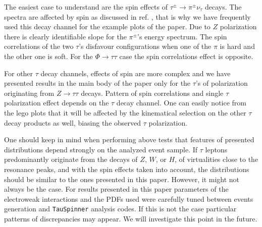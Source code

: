 \documentclass{article}
\begin{document}

The easiest case to understand are the spin effects  of $\tau^\pm \to \pi^\pm \nu_\tau$ decays. The spectra
are affected by spin as discussed in ref. \cite{jadach-was:1984,Pierzchala:2001gc}, that is why we have frequently used this decay channel for the
example plots  of the paper.
Due to $Z$ polarization  there is clearly identifiable slope for the  $\pi^\pm$'s energy spectrum.
The spin correlations of the two $\tau$'s disfavour configurations when one of the $\pi$ is hard and the other one is soft.
For the  $\Phi \to \tau \tau$ case the spin correlations effect is opposite.

For other $\tau$ decay channels, effects of spin are more complex and we have presented results in the main body of
the paper only for the $\tau$'s of polarization originating from $Z \to \tau \tau$ decays. 
Pattern of spin correlations and single $\tau$ polarization effect depends on the $\tau$ decay channel.
One can easily notice from the lego plots that it will be affected by the kinematical selection on the other $\tau$ decay products
as well, biasing the  observed $\tau$ polarization. 


One should keep in mind when performing above tests that features of presented distributions depend strongly on the analyzed event sample. 
If  $\tau$ leptons predominantly originate
from the decays of $Z$, $W$, or $H$, of virtualities close to the resonance peaks,
and with the spin effects taken into account, the distributions should be similar to the
ones presented in this paper. However, it might not always be the case. For results presented in this 
paper  parameters of the electroweak interactions and the PDFs used were carefully 
tuned between events generation and {\tt TauSpinner} analysis codes. If this is not the case 
particular patterns of discrepancies may appear. We will investigate this point in the future.
\end{document}

